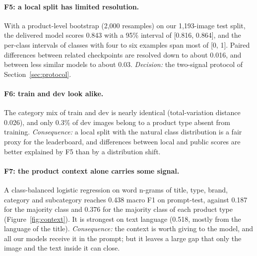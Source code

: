 \documentclass[11pt]{article}
\begin{document}
\paragraph{F5: a local split has limited resolution.} With a product-level bootstrap (2,000 resamples) on our 1,193-image test split, the delivered model scores 0.843 with a 95\% interval of [0.816, 0.864], and the per-class intervals of classes with four to six examples span most of [0, 1]. Paired differences between related checkpoints are resolved down to about 0.016, and between less similar models to about 0.03. \emph{Decision:} the two-signal protocol of Section~\ref{sec:protocol}.

\paragraph{F6: train and dev look alike.} The category mix of train and dev is nearly identical (total-variation distance 0.026), and only 0.3\% of dev images belong to a product type absent from training. \emph{Consequence:} a local split with the natural class distribution is a fair proxy for the leaderboard, and differences between local and public scores are better explained by F5 than by a distribution shift.

\paragraph{F7: the product context alone carries some signal.} A class-balanced logistic regression on word n-grams of title, type, brand, category and subcategory reaches 0.438 macro F1 on prompt-test, against 0.187 for the majority class and 0.376 for the majority class of each product type (Figure~\ref{fig:context}). It is strongest on text language (0.518, mostly from the language of the title). \emph{Consequence:} the context is worth giving to the model, and all our models receive it in the prompt; but it leaves a large gap that only the image and the text inside it can close.
\end{document}
